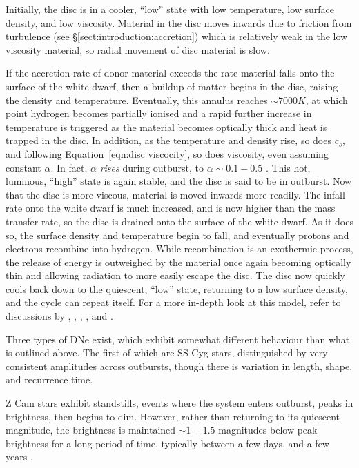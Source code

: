 Initially, the disc is in a cooler, ``low'' state with low temperature, low surface density, and low viscosity. Material in the disc moves inwards due to friction from turbulence (see \S\ref{sect:introduction:accretion}) which is relatively weak in the low viscosity material, so radial movement of disc material is slow.

If the accretion rate of donor material exceeds the rate material falls onto the surface of the white dwarf, then a buildup of matter begins in the disc, raising the density and temperature. Eventually, this annulus reaches $\sim 7000K$, at which point hydrogen becomes partially ionised and a rapid further increase in temperature is triggered as the material becomes optically thick and heat is trapped in the disc. In addition, as the temperature and density rise, so does $c_s$, and following Equation~\ref{eqn:disc viscocity}, so does viscosity, even assuming constant $\alpha$. In fact, $\alpha$ {\it rises} during outburst, to $\alpha \sim 0.1 - 0.5$ \citep{hellier2001}. This hot, luminous, ``high'' state is again stable, and the disc is said to be in outburst. Now that the disc is more viscous, material is moved inwards more readily. The infall rate onto the white dwarf is much increased, and is now higher than the mass transfer rate, so the disc is drained onto the surface of the white dwarf. As it does so, the surface density and temperature begin to fall, and eventually protons and electrons recombine into hydrogen. While recombination is an exothermic process, the release of energy is outweighed by the material once again becoming optically thin and allowing radiation to more easily escape the disc. The disc now quickly cools back down to the quiescent, ``low'' state, returning to a low surface density, and the cycle can repeat itself. For a more in-depth look at this model, refer to discussions by \citet{cannizzo1993}, \citet{osaki1996}, \citet{warner1995}, \citep{hellier2001}, and \citet{Hameury2002}.

Three types of DNe exist, which exhibit somewhat different behaviour than what is outlined above. The first of which are SS Cyg stars, distinguished by very consistent amplitudes across outbursts, though there is variation in length, shape, and recurrence time.

Z Cam stars exhibit standstills, events where the system enters outburst, peaks in brightness, then begins to dim. However, rather than returning to its quiescent magnitude, the brightness is maintained $\sim 1-1.5$ magnitudes below peak brightness for a long period of time, typically between a few days, and a few years \citep{simonsen2014}.

